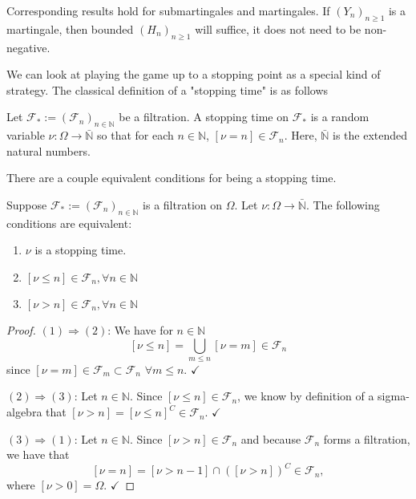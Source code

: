 Corresponding results hold for submartingales and martingales. If $(Y_{n})_{n \geq 1}$ is a martingale, then bounded \((H_{n})_{n \geq 1}\) will suffice, it does not need to be non-negative. 

We can look at playing the game up to a stopping point as a special kind of strategy. The classical definition of a "stopping time" is as follows

\begin{definition}
    Let $\mathcal{F}_{*} := (\mathcal{F}_{n})_{n \in \mathbb{N}}$ be a filtration. A stopping time on \(\mathcal{F}_{*}\) is a random variable \(\nu: \Omega \to \bar{\mathbb{N}}\) so that for each \(n \in \mathbb{N}\), \([\nu = n] \in \mathcal{F}_{n}\). Here, \(\bar{\mathbb{N}}\) is the extended natural numbers.
\end{definition}

There are a couple equivalent conditions for being a stopping time. 
\begin{proposition}
    \label{stopping_time_equiv_conds}
    Suppose $\mathcal{F}_{*} := (\mathcal{F}_{n})_{n \in \mathbb{N}}$ is a filtration on $\Omega$. Let $\nu : \Omega \to \bar{\mathbb{N}}$. The following conditions are equivalent:
    \begin{enumerate}
        \item $\nu$ is a stopping time.
        \item $[\nu \leq n] \in \mathcal{F}_{n}, \forall n \in \mathbb{N}$
        \item $[\nu > n] \in \mathcal{F}_{n}, \forall n \in \mathbb{N}$
    \end{enumerate}
\end{proposition}

\begin{proof}
    $(1) \Rightarrow (2)$: We have for $n \in \mathbb{N}$ 
    $$[\nu \leq n] = \bigcup\limits_{m \leq n}[\nu =m] \in \mathcal{F}_{n}$$
    since $[\nu = m] \in \mathcal{F}_{m} \subset \mathcal{F}_{n}$ $\forall m \leq n$. $\checkmark$

    $(2) \Rightarrow (3)$: Let $n \in \mathbb{N}$. Since $[\nu \leq n] \in \mathcal{F}_{n}$, we know by definition of a sigma-algebra that $[\nu > n] = [\nu \leq n]^{C} \in \mathcal{F}_{n}$. $\checkmark$

    $(3) \Rightarrow (1)$: Let $n \in \mathbb{N}$. Since $[\nu > n] \in \mathcal{F}_{n}$ and because $\mathcal{F}_{n}$ forms a filtration, we have that
    $$[\nu = n] =  [\nu > n-1] \cap ([\nu > n])^{C} \in \mathcal{F}_{n},$$
    where $[\nu > 0] = \Omega$. $\checkmark$
\end{proof}

